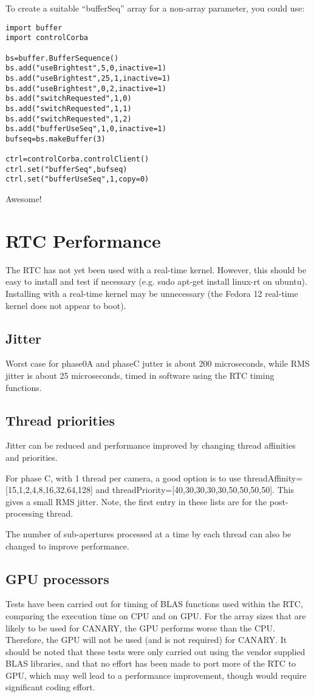 \documentclass[a4,10pt]{article}
\begin{document}
To create a suitable ``bufferSeq'' array for a non-array parameter,
you could use:
\begin{verbatim}
import buffer
import controlCorba

bs=buffer.BufferSequence()
bs.add("useBrightest",5,0,inactive=1)
bs.add("useBrightest",25,1,inactive=1)
bs.add("useBrightest",0,2,inactive=1)
bs.add("switchRequested",1,0)
bs.add("switchRequested",1,1)
bs.add("switchRequested",1,2)
bs.add("bufferUseSeq",1,0,inactive=1)
bufseq=bs.makeBuffer(3)

ctrl=controlCorba.controlClient()
ctrl.set("bufferSeq",bufseq)
ctrl.set("bufferUseSeq",1,copy=0)
\end{verbatim}

Awesome!

\section{RTC Performance}
The RTC has not yet been used with a real-time kernel.  However, this
should be easy to install and test if necessary (e.g. sudo apt-get
install linux-rt on ubuntu).  Installing with a real-time kernel may
be unnecessary (the Fedora 12 real-time kernel does not appear to boot).

\subsection{Jitter}
Worst case for phase0A and phaseC jutter is about 200 microseconds,
while RMS jitter is about 25 microseconds, timed in software using the
RTC timing functions.

\subsection{Thread priorities}
Jitter can be reduced and performance improved by changing thread
affinities and priorities.

For phase C, with 1 thread per camera, a good option is to use
threadAffinity=[15,1,2,4,8,16,32,64,128] and
threadPriority=[40,30,30,30,30,50,50,50,50].  This gives a small RMS jitter.
Note, the first entry in these lists are for the post-processing
thread.

The number of sub-apertures processed at a time by each thread can
also be changed to improve performance.


\subsection{GPU processors}
Tests have been carried out for timing of BLAS functions used within
the RTC, comparing the execution time on CPU and on GPU.  For the
array sizes that are likely to be used for CANARY, the GPU performs
worse than the CPU.  Therefore, the GPU will not be used (and is not
required) for CANARY.  It should be noted that these tests were only
carried out using the vendor supplied BLAS libraries, and that no
effort has been made to port more of the RTC to GPU, which may well
lead to a performance improvement, though would require significant
coding effort.
\end{document}
